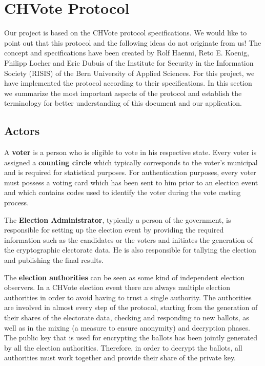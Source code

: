 \chapter{CHVote Protocol}
Our project is based on the CHVote protocol specifications. We would like to point out that this protocol and the following ideas do not originate from us! The concept and specifications have been created by Rolf Haenni, Reto E. Koenig, Philipp Locher and Eric Dubuis of the Institute for Security in the Information Society (RISIS) of the Bern University of Applied Sciences. For this project, we have implemented the protocol according to their specifications. In this section we summarize the most important aspects of the protocol and establish the terminology for better understanding of this document and our application.

\section{Actors}
A \textbf{voter} is a person who is eligible to vote in his respective state. Every voter is assigned a \textbf{counting circle} which typically corresponds to the voter's municipal and is required for statistical purposes. For authentication purposes, every voter must possess a voting card which has been sent to him prior to an election event and which contains codes used to identify the voter during the vote casting process.

The \textbf{Election Administrator}, typically a person of the government, is responsible for setting up the election event by providing the required information such as the candidates or the voters and initiates the generation of the cryptographic electorate data. He is also responsible for tallying the election and publishing the final results.

The \textbf{election authorities} can be seen as some kind of independent election observers. In a CHVote election event there are always multiple election authorities in order to avoid having to trust a single authority. The authorities are involved in almost every step of the protocol, starting from the generation of their shares of the electorate data, checking and responding to new ballots, as well as in the mixing (a measure to ensure anonymity) and decryption phases. The public key that is used for encrypting the ballots has been jointly generated by all the election authorities. Therefore, in order to decrypt the ballots, all authorities must work together and provide their share of the private key.


